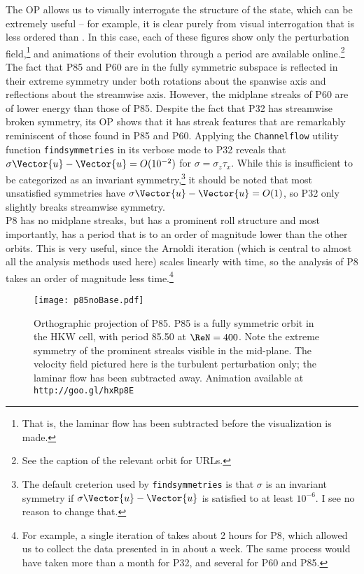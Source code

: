 The OP allows us to visually interrogate the structure of the state, which can be extremely useful -- for example, it is clear purely from visual interrogation that  is less ordered than . In this case, each of these figures show only the perturbation field,\footnote{That is, the laminar flow has been subtracted before the visualization is made.} and animations of their evolution through a period are available online.\footnote{See the caption of the relevant orbit for URLs.} The fact that P85 and P60 are in the fully symmetric subspace is reflected in their extreme symmetry under both rotations about the spanwise axis and reflections about the streamwise axis. However, the midplane streaks of P60 are of lower energy than those of P85. Despite the fact that P32 has streamwise broken symmetry, its OP shows that it has streak features that are remarkably reminiscent of those found in P85 and P60. Applying the {\tt Channelflow} utility function {\tt findsymmetries} in its verbose mode to P32 reveals that $\sigma \Vector{u} - \Vector{u} = O(10^{-2})$ for $\sigma = \sigma_z \tau_x$. While this is insufficient to be categorized as an invariant symmetry,\footnote{The default creterion used by {\tt findsymmetries} is that $\sigma$ is an invariant symmetry if $\sigma\Vector{u} - \Vector{u}$ is satisfied to at least $10^{-6}$. I see no reason to change that.} it should be noted that most unsatisfied symmetries have  $\sigma\Vector{u} - \Vector{u} = O(1)$, so P32 only slightly breaks streamwise symmetry.\\

P8 has no midplane streaks, but has a prominent roll structure and most importantly, has a period that is to an order of magnitude lower than the other orbits. This is very useful, since the Arnoldi iteration (which is central to almost all the analysis methods used here) scales linearly with time, so the analysis of P8 takes an order of magnitude less time.\footnote{For example, a single iteration of  takes about 2 hours for P8, which allowed us to collect the data presented in  in about a week. The same process would have taken more than a month for P32, and several for P60 and P85.}

\begin{figure}[h!]
\centerline{\texttt{[image: p85noBase.pdf]}}
\caption{Orthographic projection of P85. P85 is a fully symmetric orbit in the HKW cell, with period 85.50 at $\ReN=400$. Note the extreme symmetry of the prominent streaks visible in the mid-plane. The velocity field pictured here is the turbulent perturbation only; the laminar flow has been subtracted away.{ Animation available at {\tt http://goo.gl/hxRp8E}}}\label{fig:p85}
\end{figure}

